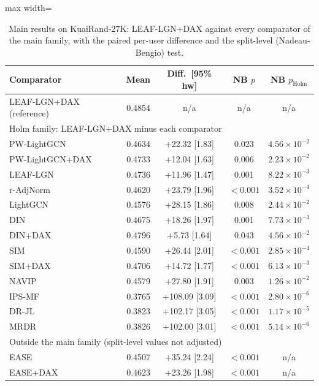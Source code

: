 \documentclass[preprint,12pt,authoryear]{elsarticle}
\begin{document}
\begin{table}[tbp]
\centering
\footnotesize
\caption{Main results on KuaiRand-27K: LEAF-LGN+DAX against every comparator of the main family, with the paired per-user difference and the split-level (Nadeau-Bengio) test.}
\label{tab:main}
\begin{adjustbox}{max width=\linewidth}
\begin{tabular}{lrccc}
\toprule
Comparator & Mean & Diff.\ [95\% hw] & NB $p$ & NB $p_{\mathrm{Holm}}$ \\
\midrule
LEAF-LGN+DAX (reference) & 0.4854 & n/a & n/a & n/a \\
\midrule
\multicolumn{5}{l}{Holm family: LEAF-LGN+DAX minus each comparator} \\
PW-LightGCN & 0.4634 & +22.32 [1.83] & 0.023 & $4.56\times10^{-2}$ \\
PW-LightGCN+DAX & 0.4733 & +12.04 [1.63] & 0.006 & $2.23\times10^{-2}$ \\
LEAF-LGN & 0.4736 & +11.96 [1.47] & 0.001 & $8.22\times10^{-3}$ \\
r-AdjNorm & 0.4620 & +23.79 [1.96] & $<0.001$ & $3.52\times10^{-4}$ \\
LightGCN & 0.4576 & +28.15 [1.86] & 0.008 & $2.44\times10^{-2}$ \\
DIN & 0.4675 & +18.26 [1.97] & 0.001 & $7.73\times10^{-3}$ \\
DIN+DAX & 0.4796 & +5.73 [1.64] & 0.043 & $4.56\times10^{-2}$ \\
SIM & 0.4590 & +26.44 [2.01] & $<0.001$ & $2.85\times10^{-4}$ \\
SIM+DAX & 0.4706 & +14.72 [1.77] & $<0.001$ & $6.13\times10^{-3}$ \\
NAVIP & 0.4579 & +27.80 [1.91] & 0.003 & $1.26\times10^{-2}$ \\
IPS-MF & 0.3765 & +108.09 [3.09] & $<0.001$ & $2.80\times10^{-6}$ \\
DR-JL & 0.3823 & +102.17 [3.05] & $<0.001$ & $1.17\times10^{-5}$ \\
MRDR & 0.3826 & +102.00 [3.01] & $<0.001$ & $5.14\times10^{-6}$ \\
\midrule
\multicolumn{5}{l}{Outside the main family (split-level values not adjusted)} \\
EASE & 0.4507 & +35.24 [2.24] & $<0.001$ & n/a \\
EASE+DAX & 0.4623 & +23.26 [1.98] & $<0.001$ & n/a \\
\bottomrule
\end{tabular}
\end{adjustbox}

\end{table}
\end{document}
